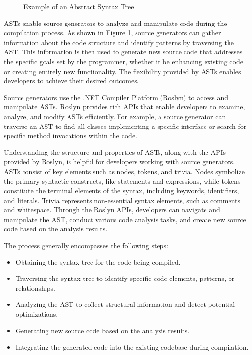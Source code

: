 \begin{figure}[H]
    \centering
    \begin{adjustbox}{max width=\textwidth, max height=0.51\textheight, keepaspectratio}
        
    \end{adjustbox}
    \caption{Example of an Abstract Syntax Tree}
    \label{fig:ast_example}
\end{figure}

ASTs enable source generators to analyze and manipulate code during the compilation process. As shown in Figure \ref{fig:ast_example}, source generators can gather information about the code structure and identify patterns by traversing the AST. This information is then used to generate new source code that addresses the specific goals set by the programmer, whether it be enhancing existing code or creating entirely new functionality. The flexibility provided by ASTs enables developers to achieve their desired outcomes.

Source generators use the .NET Compiler Platform (Roslyn) to access and manipulate ASTs. Roslyn provides rich APIs that enable developers to examine, analyze, and modify ASTs efficiently. For example, a source generator can traverse an AST to find all classes implementing a specific interface or search for specific method invocations within the code.

Understanding the structure and properties of ASTs, along with the APIs provided by Roslyn, is helpful for developers working with source generators. ASTs consist of key elements such as nodes, tokens, and trivia. Nodes symbolize the primary syntactic constructs, like statements and expressions, while tokens constitute the terminal elements of the syntax, including keywords, identifiers, and literals. Trivia represents non-essential syntax elements, such as comments and whitespace. Through the Roslyn APIs, developers can navigate and manipulate the AST, conduct various code analysis tasks, and create new source code based on the analysis results.

The process generally encompasses the following steps:
\begin{itemize}
\item Obtaining the syntax tree for the code being compiled.
\item Traversing the syntax tree to identify specific code elements, patterns, or relationships.
\item Analyzing the AST to collect structural information and detect potential optimizations.
\item Generating new source code based on the analysis results.
\item Integrating the generated code into the existing codebase during compilation.
\end{itemize}

